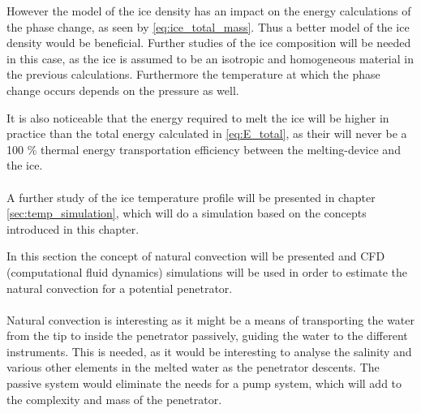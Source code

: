 However the model of the ice density has an impact on the energy calculations of the phase change, as seen by \eqref{eq:ice_total_mass}. Thus a better model of the ice density would be beneficial. Further studies of the ice composition will be needed in this case, as the ice is assumed to be an isotropic and homogeneous material in the previous calculations. Furthermore the temperature at which the phase change occurs depends on the pressure as well.

It is also noticeable that the energy required to melt the ice will be higher in practice than the total energy calculated in \eqref{eq:E_total}, as their will never be a 100 \% thermal energy transportation efficiency between the melting-device and the ice.
\\
\\
A further study of the ice temperature profile will be presented in chapter \ref{sec:temp_simulation}, which will do a simulation based on the concepts introduced in this chapter.

%



\label{sec:water_convection}

In this section the concept of natural convection will be presented and CFD (computational fluid dynamics) simulations will be used in order to estimate the natural convection for a potential penetrator.
\\
\\
Natural convection is interesting as it might be a means of transporting the water from the tip to inside the penetrator passively, guiding the water to the different instruments. This is needed, as it would be interesting to analyse the salinity and various other elements in the melted water as the penetrator descents. The passive system would eliminate the needs for a pump system, which will add to the complexity and mass of the penetrator.


